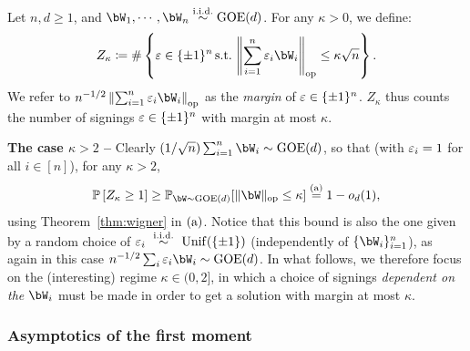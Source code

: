 Let $n, d \geq 1$, and $\bW_1, \cdots, \bW_n \iid \GOE(d)$.
For any $\kappa > 0$, we define: 
\begin{equation}
    \label{eq:def_Zkappa}
    Z_\kappa \coloneqq \# \left\{\eps \in \{\pm 1\}^n \, \textrm{s.t.} \, \left\|\sum_{i=1}^n \eps_i \bW_i\right\|_{\op} \leq \kappa \sqrt{n} \right\}.
\end{equation}
We refer to $n^{-1/2} \left\|\sum_{i=1}^n \eps_i \bW_i\right\|_{\op}$ as the \emph{margin} of $\varepsilon \in \{\pm 1\}^n$. 
$Z_\kappa$ thus counts the number of signings $\varepsilon \in \{\pm 1\}^n$ with margin at most $\kappa$.

\myskip
\textbf{The case $\kappa > 2$ --}
Clearly $(1/\sqrt{n})\sum_{i=1}^n \bW_i \sim \GOE(d)$, so that (with $\varepsilon_i = 1$ for all $i \in [n]$), for any $\kappa > 2$, 
\begin{equation*}
    \bbP\left[Z_\kappa \geq 1\right] \geq \bbP_{\bW \sim \GOE(d)}[\|\bW\|_\op \leq \kappa] \aeq 1 - \smallO_d(1),
\end{equation*}
using Theorem~\ref{thm:wigner} in $(\rm a)$.
Notice that this bound is also the one given by a random choice of $\varepsilon_i~\overset{\mathrm{i.i.d.}}{\sim}~\mathrm{Unif}(\{\pm 1\})$ (independently of $\{\bW_i\}_{i=1}^n$), as again in this case 
$n^{-1/2}\sum_{i} \eps_i \bW_i\sim\GOE(d)$.
In what follows, we therefore focus on the (interesting) regime $\kappa \in (0,2]$, in which a choice of signings \emph{dependent on the $\bW_i$} must be made in order to 
get a solution with margin at most $\kappa$.

\subsubsection{Asymptotics of the first moment}

